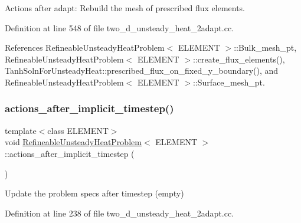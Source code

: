 Actions after adapt\+: Rebuild the mesh of prescribed flux elements. 



Definition at line 548 of file two\+\_\+d\+\_\+unsteady\+\_\+heat\+\_\+2adapt.\+cc.



References Refineable\+Unsteady\+Heat\+Problem$<$ E\+L\+E\+M\+E\+N\+T $>$\+::\+Bulk\+\_\+mesh\+\_\+pt, Refineable\+Unsteady\+Heat\+Problem$<$ E\+L\+E\+M\+E\+N\+T $>$\+::create\+\_\+flux\+\_\+elements(), Tanh\+Soln\+For\+Unsteady\+Heat\+::prescribed\+\_\+flux\+\_\+on\+\_\+fixed\+\_\+y\+\_\+boundary(), and Refineable\+Unsteady\+Heat\+Problem$<$ E\+L\+E\+M\+E\+N\+T $>$\+::\+Surface\+\_\+mesh\+\_\+pt.

\mbox{\label{classRefineableUnsteadyHeatProblem_aa740f2eb1b3909100a04709b401c0b41}} 
\subsubsection{\texorpdfstring{actions\+\_\+after\+\_\+implicit\+\_\+timestep()}{actions\_after\_implicit\_timestep()}}
{\footnotesize\ttfamily template$<$class E\+L\+E\+M\+E\+NT$>$ \\
void \hyperlink{classRefineableUnsteadyHeatProblem}{Refineable\+Unsteady\+Heat\+Problem}$<$ E\+L\+E\+M\+E\+NT $>$\+::actions\+\_\+after\+\_\+implicit\+\_\+timestep (\begin{DoxyParamCaption}{ }\end{DoxyParamCaption})\hspace{0.3cm}{\ttfamily [inline]}}



Update the problem specs after timestep (empty) 



Definition at line 238 of file two\+\_\+d\+\_\+unsteady\+\_\+heat\+\_\+2adapt.\+cc.

\mbox{\label{classRefineableUnsteadyHeatProblem_ada522772b79e92a75edf3724d0a273da}} 
